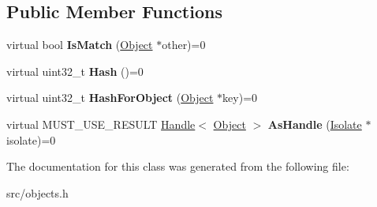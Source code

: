 \subsection*{Public Member Functions}
\begin{DoxyCompactItemize}
\item 
\hypertarget{classv8_1_1internal_1_1_hash_table_key_a2ab80629572d6a06beea7d0f74cb5b20}{}virtual bool {\bfseries Is\+Match} (\hyperlink{classv8_1_1internal_1_1_object}{Object} $\ast$other)=0\label{classv8_1_1internal_1_1_hash_table_key_a2ab80629572d6a06beea7d0f74cb5b20}

\item 
\hypertarget{classv8_1_1internal_1_1_hash_table_key_a28f8ad09c53eac2bd5888d48f376a949}{}virtual uint32\+\_\+t {\bfseries Hash} ()=0\label{classv8_1_1internal_1_1_hash_table_key_a28f8ad09c53eac2bd5888d48f376a949}

\item 
\hypertarget{classv8_1_1internal_1_1_hash_table_key_ac2bd1e6c42749dcf182f9e9cf29b2ee2}{}virtual uint32\+\_\+t {\bfseries Hash\+For\+Object} (\hyperlink{classv8_1_1internal_1_1_object}{Object} $\ast$key)=0\label{classv8_1_1internal_1_1_hash_table_key_ac2bd1e6c42749dcf182f9e9cf29b2ee2}

\item 
\hypertarget{classv8_1_1internal_1_1_hash_table_key_aaac5f148b44febab48f06c302dc251a7}{}virtual M\+U\+S\+T\+\_\+\+U\+S\+E\+\_\+\+R\+E\+S\+U\+L\+T \hyperlink{classv8_1_1internal_1_1_handle}{Handle}$<$ \hyperlink{classv8_1_1internal_1_1_object}{Object} $>$ {\bfseries As\+Handle} (\hyperlink{classv8_1_1internal_1_1_isolate}{Isolate} $\ast$isolate)=0\label{classv8_1_1internal_1_1_hash_table_key_aaac5f148b44febab48f06c302dc251a7}

\end{DoxyCompactItemize}


The documentation for this class was generated from the following file\+:\begin{DoxyCompactItemize}
\item 
src/objects.\+h\end{DoxyCompactItemize}
